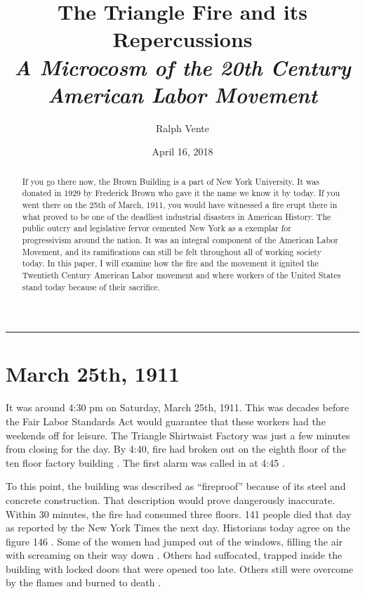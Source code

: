 \documentclass[12pt]{article}
\begin{document}
  \title{The Triangle Fire and its Repercussions \\
  {\large \textit {A Microcosm of the 20th Century American Labor Movement}}}
  \author{Ralph Vente}
  \date{April 16, 2018}

  \begin{titlepage}
    \maketitle
    \hrule
    \thispagestyle{empty}

    \begin{abstract}

      If you go there now, the Brown Building is a part of New York University.
      It was donated in 1929 by Frederick Brown who gave it the name we know it
      by today. If you went there on the 25th of March, 1911, you would have
      witnessed a fire erupt there in what proved to be one of the deadliest
      industrial disasters in American History. The public outcry and
      legislative fervor cemented New York as a exemplar for progressivism
      around the nation. It was an integral component of the American Labor
      Movement, and its ramifications can still be felt throughout all of
      working society today. In this paper, I will examine how the fire and the
      movement it ignited the Twentieth Century American Labor movement and
      where workers of the United States stand today because of their sacrifice.

    \end{abstract}
  \end{titlepage}

\section{March 25th, 1911}

It was around 4:30 pm on Saturday, March 25th, 1911. This was decades before the
Fair Labor Standards Act would guarantee that these workers had the weekends off
for leisure. The Triangle Shirtwaist Factory was just a few minutes from closing
for the day. By 4:40, fire had broken out on the eighth floor of the ten floor
factory building \parencite[628]{Ev1995}. The first alarm was called in at 4:45
\parencite[628]{Ev1995}.

To this point, the building was described as ``fireproof'' because of its steel
and concrete construction. That description would prove dangerously inaccurate.
Within 30 minutes, the fire had consumed three floors. 141 people died that day
as reported by the New York Times the next day. Historians today agree on the
figure 146 \parencite[622]{Ev1995}. Some of the women had jumped out of the
windows, filling the air with screaming on their way down
\parencite[14]{stein2010triangle}. Others had suffocated, trapped inside the
building with locked doors that were opened too late. Others still were overcome
by the flames and burned to death \parencite{shepherd1911eyewitness}.
\end{document}
